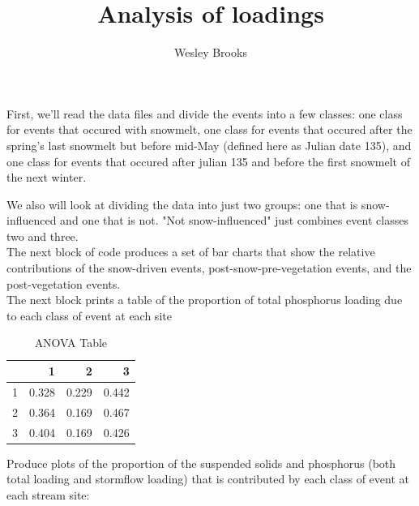 \documentclass[12pt]{article}
\title{Analysis of loadings}
\author{Wesley Brooks}
\date{}                                           %
\begin{document}
\maketitle




First, we'll read the data files and divide the events into a few classes: one class for events that occured with snowmelt, one class for events that occured after the spring's last snowmelt but before mid-May (defined here as Julian date 135), and one class for events that occured after julian 135 and before the first snowmelt of the next winter. 

We also will look at dividing the data into just two groups: one that is snow-influenced and one that is not. "Not snow-influenced" just combines event classes two and three.\\











The next block of code produces a set of bar charts that show the relative contributions of the snow-driven events, post-snow-pre-vegetation events, and the post-vegetation events.\\






The next block prints a table of the proportion of total phosphorus loading due to each class of event at each site\\



\begin{table}[tbp]
\begin{center}
\caption{ANOVA Table}
\label{tab:one}
\begin{tabular}{rrrr}
  \hline
 & 1 & 2 & 3 \\ 
  \hline
1 & 0.328 & 0.229 & 0.442 \\ 
  2 & 0.364 & 0.169 & 0.467 \\ 
  3 & 0.404 & 0.169 & 0.426 \\ 
   \hline
\end{tabular}
\end{center}
\end{table}


Produce plots of the proportion of the suspended solids and phosphorus (both total loading and stormflow loading) that is contributed by each class of event at each stream site:\\
\end{document}
